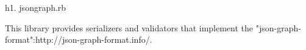 h1. jsongraph.rb

This library provides serializers and validators that implement the
"json-graph-format":http://json-graph-format.info/.

